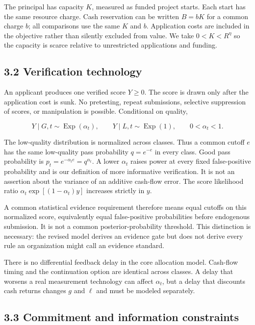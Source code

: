 \documentclass[
  11pt,
]{article}
\begin{document}
The principal has capacity \(K\), measured as funded project starts.
Each start has the same resource charge. Cash reservation can be written
\(B=bK\) for a common charge \(b\); all comparisons use the same \(K\)
and \(b\). Application costs are included in the objective rather than
silently excluded from value. We take \(0<K<R^{\eta}\) so the capacity
is scarce relative to unrestricted applications and funding.

\subsection{3.2 Verification technology}\label{verification-technology}

An applicant produces one verified score \(Y\geq0\). The score is drawn
only after the application cost is sunk. No pretesting, repeat
submissions, selective suppression of scores, or manipulation is
possible. Conditional on quality,

\[Y\mid G,t\sim\operatorname{Exp}(\alpha_t),\qquad
Y\mid L,t\sim\operatorname{Exp}(1),\qquad 0<\alpha_t<1. \tag{2}\]

The low-quality distribution is normalized across classes. Thus a common
cutoff \(e\) has the same low-quality pass probability \(q=e^{-e}\) in
every class. Good pass probability is
\(p_t=e^{-\alpha_t e}=q^{\alpha_t}\). A lower \(\alpha_t\) raises power
at every fixed false-positive probability and is our definition of more
informative verification. It is not an assertion about the variance of
an additive cash-flow error. The score likelihood ratio
\(\alpha_t\exp[(1-\alpha_t)y]\) increases strictly in \(y\).

A common statistical evidence requirement therefore means equal cutoffs
on this normalized score, equivalently equal false-positive
probabilities before endogenous submission. It is not a common
posterior-probability threshold. This distinction is necessary: the
revised model derives an evidence gate but does not derive every rule an
organization might call an evidence standard.

There is no differential feedback delay in the core allocation model.
Cash-flow timing and the continuation option are identical across
classes. A delay that worsens a real measurement technology can affect
\(\alpha_t\), but a delay that discounts cash returns changes \(g\) and
\(\ell\) and must be modeled separately.

\subsection{3.3 Commitment and information
constraints}\label{commitment-and-information-constraints}
\end{document}
